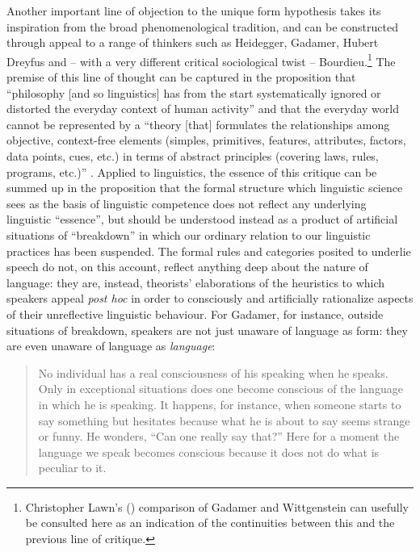 \documentclass[output=paper]{langscibook}
\begin{document}
Another important line of objection to the unique form hypothesis takes its inspiration from the broad phenomenological tradition, and can be constructed through appeal to a range of thinkers such as Heidegger, Gadamer, Hubert Dreyfus and – with a very different critical sociological twist – Bourdieu.\footnote{Christopher Lawn’s (\citeyear{Lawn2004}) comparison of Gadamer and Wittgenstein can usefully be consulted here as an indication of the continuities between this and the previous line of critique.} The premise of this line of thought can be captured in the proposition that ``philosophy [and so linguistics] has from the start systematically ignored or distorted the everyday context of human activity'' and that the everyday world cannot be represented by a ``theory [that] formulates the relationships among objective, context-free elements (simples, primitives, features, attributes, factors, data points, cues, etc.) in terms of abstract principles (covering laws, rules, programs, etc.)'' \citep[25, 28]{DreyfusDreyfus1988}. Applied to linguistics, the essence of this critique can be summed up in the proposition that the formal structure which linguistic science sees as the basis of linguistic competence does not reflect any underlying linguistic ``essence'', but should be understood instead as a product of artificial situations of ``breakdown'' in which our ordinary relation to our linguistic practices has been suspended. The formal rules and categories posited to underlie speech do not, on this account, reflect anything deep about the nature of language: they are, instead, theorists' elaborations of the heuristics to which speakers appeal \emph{post hoc} in order to consciously and artificially rationalize aspects of their unreflective linguistic behaviour. For Gadamer, for instance, outside situations of breakdown, speakers are not just unaware of language as form: they are even unaware of language as \emph{language}:

\begin{quotation}
No individual has a real consciousness of his speaking when he speaks. Only in exceptional situations does one become conscious of the language in which he is speaking. It happens, for instance, when someone starts to say something but hesitates because what he is about to say seems strange or funny. He wonders, ``Can one really say that?'' Here for a moment the language we speak becomes conscious because it does not do what is peculiar to it. \citep[64]{Gadamer19761966}
\end{quotation}
\end{document}
